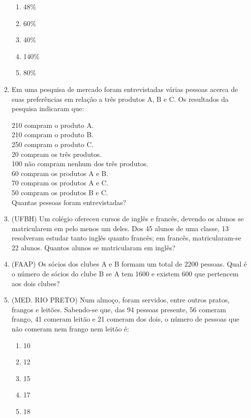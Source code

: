 \documentclass[a4paper,12pt]{article}
\begin{document}
\begin{center}
\begin{enumerate}
\begin{enumerate}

\item 48\% 
\item 60\% 
\item 40\% 
\item 140\% 
\item 80\%

\end{enumerate}

\item Em uma pesquisa de mercado foram entrevistadas várias pessoas acerca de suas preferências em relação a três produtos A, B e C. Os resultados da pesquisa indicaram que: 
  
\begin{enumerate}

210 compram o produto A. \\
210 compram o produto B. \\
250 compram o produto C. \\
20 compram os três produtos. \\ 
100 não compram nenhum dos três produtos. \\ 
60 compram os produtos A e B. \\
70 compram os produtos A e C. \\
50 compram os produtos B e C. \\

Quantas pessoas foram entrevistadas? 
\end{enumerate}

\item (UFBH) Um colégio ofereceu cursos de inglês e francês, devendo os alunos se matricularem em pelo menos um deles. Dos 45 alunos de uma classe, 13 resolveram estudar tanto inglês quanto francês; em francês, matricularam-se 22 alunos. Quantos alunos se matricularam em inglês? 


\item (FAAP) Os sócios dos clubes A e B formam um total de 2200 pessoas. Qual é o número de sócios do clube B se A tem 1600 e existem 600 que pertencem aos dois clubes? 


\item (MED. RIO PRETO) Num almoço, foram servidos, entre outros pratos, frangos e leitões. Sabendo-se que, das 94 pessoas presente, 56 comeram frango, 41 comeram leitão e 21 comeram dos dois, o número de pessoas que não comeram nem frango nem leitão é: 

\begin{enumerate}
\item 10 
\item 12 
\item 15 
\item 17 
\item 18 
\end{enumerate}


\end{enumerate}
\end{center}
\end{document}
